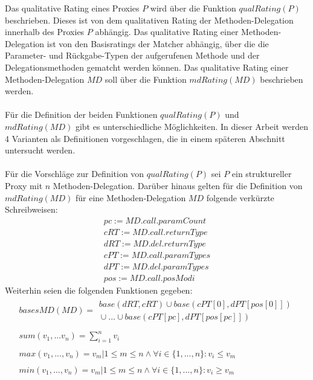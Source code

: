 \documentclass[a4paper,12pt]{article}
\begin{document}
Das qualitative Rating eines Proxies $P$ wird über die Funktion $\mathit{qualRating(P)}$ beschrieben. Dieses ist von dem qualitativen Rating der Methoden-Delegation innerhalb des Proxies $P$ abhängig. Das qualitative Rating einer Methoden-Delegation ist von den Basisratings der Matcher abhängig, über die die Parameter- und Rückgabe-Typen der aufgerufenen Methode und der Delegationsmethoden gematcht werden können. Das qualitative Rating einer Methoden-Delegation $\mathit{MD}$ soll über die Funktion $\mathit{mdRating(MD)}$ beschrieben werden.\\\\
Für die Definition der beiden Funktionen $\mathit{qualRating(P)}$ und $\mathit{mdRating(MD)}$ gibt es unterschiedliche Möglichkeiten. In dieser Arbeit werden 4 Varianten als Definitionen vorgeschlagen, die in einem späteren Abschnitt untersucht werden.\\\\
Für die Vorschläge zur Definition von $\mathit{qualRating(P)}$ sei $P$ ein struktureller Proxy mit $n$ Methoden-Delegation.
Darüber hinaus gelten für die Definition von $\mathit{mdRating(MD)}$ für eine Methoden-Delegation $\mathit{MD}$ folgende verkürzte Schreibweisen:
\begin{gather*}
	\mathit{pc} := \mathit{MD.call.paramCount}
	\\
	\mathit{cRT} := \mathit{MD.call.returnType}
	\\
	\mathit{dRT} := \mathit{MD.del.returnType}
	\\
	\mathit{cPT} := \mathit{MD.call.paramTypes}
	\\
	\mathit{dPT} := \mathit{MD.del.paramTypes}
	\\
	\mathit{pos} := \mathit{MD.call.posModi}
\end{gather*}
Weiterhin seien die folgenden Funktionen gegeben:
\begin{gather*}
\mathit{basesMD(MD)} =  
				\begin{array}{l}
					  \mathit{base(dRT, cRT)} \mathit{ }\cup \mathit{base(cPT[0],dPT[pos[0]])} \\
					  \mathit{ }\cup ... \cup \mathit{base(cPT[pc],dPT[pos[pc]])}
				\end{array}    
				\\\\
				\mathit{sum(v_1,...v_n)} = \sum_{i=1}^{n}v_i
\\\\         
\mathit{max(v_1,...,v_n)} = v_{m}| 1 \leq m \leq n  \wedge \forall i \in  \{1,...,n\}: v_i \leq v_{m}
\\\\       
\mathit{min(v_1,...,v_n)} = v_{m}| 1 \leq m \leq n  \wedge \forall i \in  \{1,...,n\}: v_i \geq v_{m}
\\\\    
\end{gather*}
\end{document}
